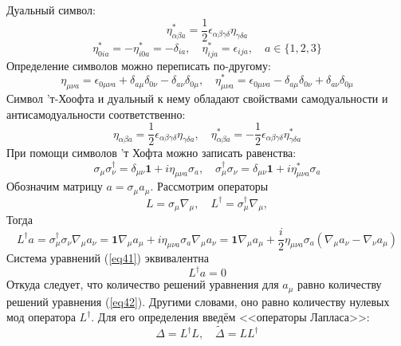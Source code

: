 \documentclass[12pt]{article}
\theoremstyle{definition}
\begin{document}
Дуальный символ:
\begin{equation}
    \eta^*_{\alpha\beta a}=\frac{1}{2}\epsilon_{\alpha\beta\gamma\delta}\eta_{\gamma\delta a}
\end{equation}
\begin{equation}
    \eta^*_{0ia}=-\eta^*_{i0a}=-\delta_{ia},\quad\eta^*_{ija}=\epsilon_{ija},\quad a\in\{1,2,3\}
\end{equation}
Определение символов можно переписать по-другому:
\begin{equation}
    \eta_{\mu\nu a}=\epsilon_{0\mu\nu a}+\delta_{a\mu}\delta_{0\nu}-\delta_{a\nu}\delta_{0\mu},\quad \eta^*_{\mu\nu a}=\epsilon_{0\mu\nu a}-\delta_{a\mu}\delta_{0\nu}+\delta_{a\nu}\delta_{0\mu}
\end{equation}
Символ 'т-Хоофта и дуальный к нему обладают свойствами самодуальности и антисамодуальности соответственно:
\begin{equation}
    \eta_{\alpha\beta a}=\frac{1}{2}\epsilon_{\alpha\beta\gamma\delta}\eta_{\gamma\delta a},\quad\eta^*_{\alpha\beta a}=-\frac{1}{2}\epsilon_{\alpha\beta\gamma\delta}\eta^*_{\gamma\delta a}
\end{equation}
При помощи символов 'т Хофта можно записать равенства:
\begin{equation}
    \sigma_\mu\sigma^\dagger_\nu=\delta_{\mu\nu}\bm{1}+i\eta_{\mu\nu a}\sigma_a,\quad\sigma^\dagger_\mu\sigma_\nu=\delta_{\mu\nu}\bm{1}+i\eta^*_{\mu\nu a}\sigma_a
\end{equation}
Обозначим матрицу $a=\sigma_\mu a_\mu$. Рассмотрим операторы
\begin{equation}
    L=\sigma_\mu\nabla_\mu,\quad L^\dagger=\sigma^\dagger_\mu\nabla_\mu,
\end{equation}
Тогда
\begin{equation}
    L^\dagger a=\sigma^\dagger_\mu\sigma_\nu\nabla_\mu a_\nu=\bm{1}\nabla_\mu a_\mu+i\eta_{\mu\nu a}\sigma_a\nabla_\mu a_\nu=\bm{1}\nabla_\mu a_\mu+\frac{i}{2}\eta_{\mu\nu a}\sigma_a(\nabla_\mu a_\nu-\nabla_\nu a_\mu)
\end{equation}
Система уравнений (\ref{eq41}) эквивалентна
\begin{equation}\label{eq42}
    L^\dagger a=0
\end{equation}
Откуда следует, что количество решений уравнения для $a_\mu$ равно количеству решений уравнения (\ref{eq42}). Другими словами, оно равно количеству нулевых мод оператора $L^\dagger$. Для его определения введём <<операторы Лапласа>>:
\begin{equation}
    \Delta=L^\dagger L,\quad\tilde{\Delta}=LL^\dagger
\end{equation}
\end{document}
